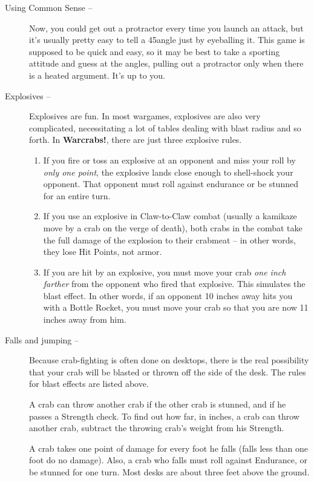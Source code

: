 \documentclass[a4paper,10pt]{article}
\newcommand{\warcrabs}{\textbf{Warcrabs!}}
\begin{document}
\begin{description}
 \item[Using Common Sense --] Now, you could get out a protractor every time you launch an attack, but it's usually pretty easy to tell a 45\textdegree\hspace{4pt}angle just by eyeballing it. This game is supposed to be quick and easy, so it may be best to take a sporting attitude and guess at the angles, pulling out a protractor only when there is a heated argument. It's up to you.

 \item[Explosives --] Explosives are fun. In most wargames, explosives are also very complicated, necessitating a lot of tables dealing with blast radius and so forth. In \warcrabs, there are just three explosive rules.

 \begin{enumerate}
  \item If you fire or toss an explosive at an opponent and miss your roll by \textit{only one point}, the explosive lands close enough to shell-shock your opponent. That opponent must roll against endurance or be stunned for an entire turn.
  \item If you use an explosive in Claw-to-Claw combat (usually a kamikaze move by a crab on the verge of death), both crabs in the combat take the full damage of the explosion to their crabmeat -- in other words, they lose Hit Points, not armor.
  \item If you are hit by an explosive, you must move your crab \textit{one inch farther} from the opponent who fired that explosive. This simulates the blast effect. In other words, if an opponent 10 inches away hits you with a Bottle Rocket, you must move your crab so that you are now 11 inches away from him.
 \end{enumerate}
 \item[Falls and jumping --] Because crab-fighting is often done on desktops, there is the real possibility that your crab will be blasted or thrown off the side of the desk. The rules for blast effects are listed above.

 A crab can throw another crab if the other crab is stunned, and if he passes a Strength check. To find out how far, in inches, a crab can throw another crab, subtract the throwing crab's weight from his Strength.

 A crab takes one point of damage for every foot he falls (falls less than one foot do no damage). Also, a crab who falls must roll against Endurance, or be stunned for one turn. Most desks are about three feet above the ground.


\end{description}
\end{document}
